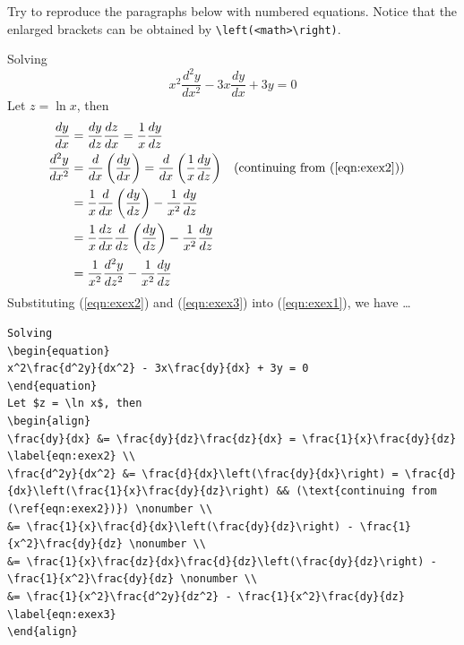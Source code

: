 \begin{exercisebox}
\begin{Exercise}
Try to reproduce the paragraphs below with numbered equations. Notice that the enlarged brackets can be obtained by \texttt{\textbackslash left(<math>\textbackslash right)}.\par
Solving
\begin{equation}
x^2\frac{d^2y}{dx^2} - 3x\frac{dy}{dx} + 3y = 0 \label{eqn:exex1}
\end{equation} 
Let $z = \ln x$, then
\begin{align}
\frac{dy}{dx} &= \frac{dy}{dz}\frac{dz}{dx} = \frac{1}{x}\frac{dy}{dz} \label{eqn:exex2} \\
\frac{d^2y}{dx^2} &= \frac{d}{dx}\left(\frac{dy}{dx}\right) = \frac{d}{dx}\left(\frac{1}{x}\frac{dy}{dz}\right) && (\text{continuing from (\ref{eqn:exex2})}) \nonumber \\
&= \frac{1}{x}\frac{d}{dx}\left(\frac{dy}{dz}\right) - \frac{1}{x^2}\frac{dy}{dz} \nonumber \\
&= \frac{1}{x}\frac{dz}{dx}\frac{d}{dz}\left(\frac{dy}{dz}\right) - \frac{1}{x^2}\frac{dy}{dz} \nonumber \\
&= \frac{1}{x^2}\frac{d^2y}{dz^2} - \frac{1}{x^2}\frac{dy}{dz} \label{eqn:exex3}
\end{align}
Substituting (\ref{eqn:exex2}) and (\ref{eqn:exex3}) into (\ref{eqn:exex1}), we have \ldots
\end{Exercise}
\end{exercisebox}
\begin{Answer}
\begin{lstlisting}
Solving
\begin{equation}
x^2\frac{d^2y}{dx^2} - 3x\frac{dy}{dx} + 3y = 0
\end{equation} 
Let $z = \ln x$, then
\begin{align}
\frac{dy}{dx} &= \frac{dy}{dz}\frac{dz}{dx} = \frac{1}{x}\frac{dy}{dz} \label{eqn:exex2} \\
\frac{d^2y}{dx^2} &= \frac{d}{dx}\left(\frac{dy}{dx}\right) = \frac{d}{dx}\left(\frac{1}{x}\frac{dy}{dz}\right) && (\text{continuing from (\ref{eqn:exex2})}) \nonumber \\
&= \frac{1}{x}\frac{d}{dx}\left(\frac{dy}{dz}\right) - \frac{1}{x^2}\frac{dy}{dz} \nonumber \\
&= \frac{1}{x}\frac{dz}{dx}\frac{d}{dz}\left(\frac{dy}{dz}\right) - \frac{1}{x^2}\frac{dy}{dz} \nonumber \\
&= \frac{1}{x^2}\frac{d^2y}{dz^2} - \frac{1}{x^2}\frac{dy}{dz} \label{eqn:exex3}
\end{align}
\end{lstlisting}  
\end{Answer}

